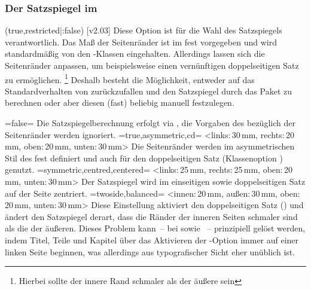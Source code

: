 \begin{DeclareEntity*}{}
\begin{DeclareEntity*}{}
\begin{DeclareEntity*}{}
\subsubsection{Der Satzspiegel im \TUDCD}
%
\begin{Declaration}
  {}
  (true,restricted|:false)
  [v2.03]
Diese Option ist für die Wahl des Satzspiegels verantwortlich. Das Maß der 
Seitenränder ist im \CD fest vorgegeben und wird standardmäßig von den 
\TUDScript-Klassen eingehalten. Allerdings lassen sich die Seitenränder 
anpassen, um beispielsweise einen vernünftigen doppelseitigen Satz zu 
ermöglichen.%
\footnote{Hierbei sollte der innere Rand schmaler als der äußere sein}
Deshalb besteht die Möglichkeit, entweder auf das Standardverhalten von 
\KOMAScript zurückzufallen und den Satzspiegel durch das Paket 
 zu berechnen oder aber diesen (fast) beliebig manuell 
festzulegen.
%
\begin{DeclareValues}
\itemval=false=
  Die Satzspiegelberechnung erfolgt via , die Vorgaben des 
  \CDs bezüglich der Seitenränder werden ignoriert.
\itemval*=true,asymmetric,cd=%
    <links:\,30\,mm, rechts:\,20\,mm, oben:\,20\,mm, unten:\,30\,mm>
  Die Seitenränder werden im asymmetrischen Stil des \CDs fest definiert und 
  auch für den doppelseitigen Satz (Klassenoption ) 
  genutzt.%
\itemval=symmetric,centred,centered=%
    <links:\,25\,mm, rechts:\,25\,mm, oben:\,20\,mm, unten:\,30\,mm>
  Der Satzspiegel wird im einseitigen sowie doppelseitigen Satz auf der Seite 
  zentriert.%
\itemval=twoside,balanced=%
    <innen:\,20\,mm, außen:\,30\,mm, oben:\,20\,mm, unten:\,30\,mm>
  Diese Einstellung aktiviert den doppelseitigen Satz () 
  und ändert den Satzspiegel derart, dass die Ränder der inneren Seiten 
  schmaler sind als die der äußeren.%
  Dieses Problem kann~-- bei  sowie ~-- 
  prinzipiell gelöst werden, indem Titel, Teile und Kapitel über das Aktivieren 
  der \KOMAScript-Option  immer auf einer linken Seite 
  beginnen, was allerdings aus typografischer Sicht eher unüblich ist.

\end{DeclareValues}
\end{Declaration}
\end{DeclareEntity*}
\end{DeclareEntity*}
\end{DeclareEntity*}
